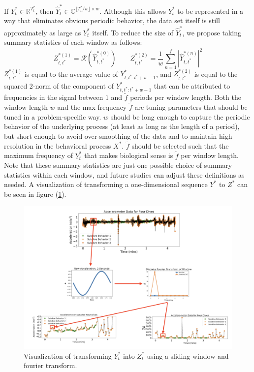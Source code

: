 If $Y^*_t \in \mathbb{R}^{T^*_t}$, then $\hat{Y}_t^* \in \mathbb{C}^{\lfloor T^*_t / w \rfloor \times w}$. Although this allows $Y^*_t$ to be represented in a way that eliminates obvious periodic behavior, the data set itself is still approximately as large as $Y^*_t$ itself. To reduce the size of $\hat{Y}^*_t$, we propose taking summary statistics of each window as follows:
%
$$Z_{t,t^*}^{*(1)} = \mathcal{R}\left(\hat{Y}^{*(0)}_{t,t^*}\right) \qquad Z_{t,t^*}^{*(2)} = \frac{1}{w}\sum_{n=1}^{\tilde{f}}|\hat{Y}^{*(n)}_{t,t^*}|^2$$
%
$Z_{t,t^*}^{*(1)}$ is equal to the average value of $Y_{t,t^*:t^*+w-1}^*$, and $Z_{t,t^*}^{*(2)}$ is equal to the squared 2-norm of the component of $Y_{t,t^*:t^*+w-1}^*$ that can be attributed to frequencies in the signal between $1$ and $\tilde{f}$ periods per window length. Both the window length $w$ and the max frequency $\tilde{f}$ are tuning parameters that should be tuned in a problem-specific way. $w$ should be long enough to capture the periodic behavior of the underlying process (at least as long as the length of a period), but short enough to avoid over-smoothing of the data and to maintain high resolution in the behavioral process $X^*$. $\tilde{f}$ should be selected such that the maximum frequency of $Y_t^*$ that makes biological sense is $\tilde{f}$ per window length. Note that these summary statistics are just one possible choice of summary statistics within each window, and future studies can adjust these definitions as needed.
A visualization of transforming a one-dimensional sequence $Y^*$ to $Z^*$ can be seen in figure (\ref{fig:fourier_example}).

\begin{figure}[h!]
	\centering
	\includegraphics[width=7.5in]{../Plots/fourier_transform.png}
	\caption{Visualization of transforming $Y^*_t$ into $Z^*_t$ using a sliding window and fourier transform.}
	\label{fig:fourier_example}
\end{figure}

